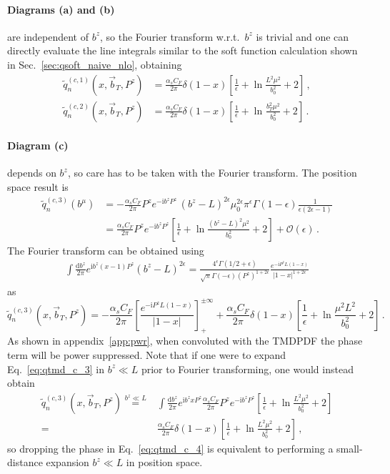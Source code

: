 \documentclass[11pt,a4paper]{article}
\DeclareRobustCommand{\eq}[1]{Eq.~\eqref{eq:#1}}
\DeclareRobustCommand{\app}[1]{appendix~\ref{app:#1}}
\DeclareRobustCommand{\sec}[1]{Sec.~\ref{sec:#1}}
\newcommand{\df}{\mathrm{d}}
\newcommand{\img}{\mathrm{i}}
\newcommand{\eps}{\epsilon}
\newcommand{\cO}{\mathcal{O}}
\newcommand{\nn}{\nonumber}
\newcommand{\as}{\alpha_s}
\newcommand{\Lb}[1]{\ln^{#1}\frac{b_T^2 \mu^2}{b_0^2}}
\newcommand{\bt}{\vec b_T}
\newcommand{\plusinf}{_+^{\pm\infty}}
\begin{document}
\paragraph{Diagrams (a) and (b)} are independent of $b^z$, so the Fourier transform w.r.t.\ $b^z$ is trivial
and one can directly evaluate the line integrals
similar to the soft function calculation shown in \sec{qsoft_naive_nlo},
obtaining
\begin{align} \label{eq:qtmd_c_2}
 \tilde q_n^{(c,1)}(x, \bt, P^z) &
 = \frac{\as C_F}{2\pi} \delta(1-x) \left[ \frac{1}{\eps} + \ln\frac{L^2 \mu^2}{b_0^2} + 2 \right]
\,,\\
 \tilde q_n^{(c,2)}(x, \bt, P^z) &
 = \frac{\as C_F}{2\pi} \delta(1-x) \left[
   \frac{1}{\eps} + \Lb{} + 2 \right]
\,.\end{align}

\paragraph{Diagram (c)} depends on $b^z$, so care has to be taken with the Fourier transform.
The position space result is
\begin{align} \label{eq:qtmd_c_3}
 \tilde q_n^{(c,3)}(b^\mu) &
 = -\frac{\as C_F}{2\pi} P^z e^{-\img b^z P^z} \, (b^z-L)^{2\eps} \mu_0^{2\eps} \pi^\eps \Gamma(1-\eps)
  \frac{1}{\eps(2\eps-1)}
\nn\\&
 = \frac{\as C_F}{2\pi} P^z e^{-\img b^z P^z} \left[ \frac{1}{\eps} + \ln\frac{(b^z-L)^2 \mu^2}{b_0^2} + 2 \right]
  + \cO(\eps)
\,.\end{align}
The Fourier transform can be obtained using \cite{Izubuchi:2018srq}
\begin{align}
 \int\frac{\df b^z}{2\pi} e^{\img b^z (x-1) P^z} (b^z-L)^{2\eps}
 = \frac{4^\eps \Gamma(1/2+\eps)}{\sqrt{\pi} \Gamma(-\eps) (P^z)^{1+2\eps}}
   \frac{e^{- \img P^z L (1-x)}}{ |1-x|^{1+2\eps} }
\end{align}
as
\begin{equation} \label{eq:qtmd_c_4}
 \tilde q_n^{(c,3)}(x,\bt,P^z)
 = -\frac{\as C_F}{2\pi} \left[\frac{e^{-\img P^z L (1-x)}}{|1-x|} \right]\plusinf
   + \frac{\as C_F}{2\pi} \delta(1-x) \left[\frac{1}{\eps} + \ln\frac{\mu^2 L^2}{b_0^2} + 2 \right]
\,.\end{equation}
As shown in \app{pwr}, when convoluted with the TMDPDF the phase term will be power suppressed.
Note that if one were to expand \eq{qtmd_c_3} in $b^z \ll L$ prior to Fourier transforming,
one would instead obtain
\begin{align} \label{eq:qtmd_c_5}
 \tilde q_n^{(c,3)}(x,\bt,P^z)
 \stackrel{b^z \ll L}{=}
 &\int \frac{\df b^z}{2\pi} e^{\img b^z x P^z}
  \frac{\as C_F}{2\pi} P^z e^{-\img b^z P^z} \left[ \frac{1}{\eps} + \ln\frac{L^2 \mu^2}{b_0^2} + 2 \right]
\nn\\
 =~&\frac{\as C_F}{2\pi} \delta(1-x) \left[ \frac{1}{\eps} + \ln\frac{L^2 \mu^2}{b_0^2} + 2 \right]
\,,\end{align}
so dropping the phase in \eq{qtmd_c_4} is equivalent to performing a small-distance expansion
$b^z \ll L$ in position space.
\end{document}

